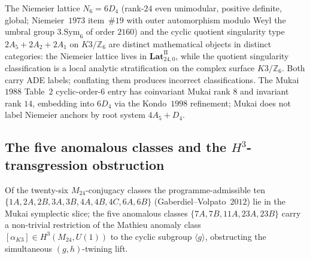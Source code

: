 \begin{remark}
\label{rem:k3e-niemeier-vs-fixed-locus}
The Niemeier lattice $N_6 = 6 D_4$ (rank-$24$ even unimodular, positive definite, global; Niemeier~$1973$ item~\#$19$ with outer automorphism modulo Weyl the umbral group $3.\mathrm{Sym}_6$ of order $2160$) and the cyclic quotient singularity type $2 A_5 + 2 A_2 + 2 A_1$ on $K3/\mathbb{Z}_6$ are distinct mathematical objects in distinct categories: the Niemeier lattice lives in $\mathbf{Lat}^{\mathrm{II}}_{24, 0}$, while the quotient singularity classification is a local analytic stratification on the complex surface $K3/\mathbb{Z}_6$. Both carry ADE labels; conflating them produces incorrect classifications. The Mukai~$1988$ Table~$2$ cyclic-order-$6$ entry has coinvariant Mukai rank $8$ and invariant rank $14$, embedding into $6 D_4$ via the Kondo~$1998$ refinement; Mukai does not label Niemeier anchors by root system $4 A_5 + D_4$.
\end{remark}

\subsection{The five anomalous classes and the \texorpdfstring{$H^3$}{H-3}-transgression obstruction}
\label{subsec:k3e-anomalous-H3-transgression}

Of the twenty-six $M_{24}$-conjugacy classes the programme-admissible ten $\{1A, 2A, 2B, 3A, 3B, 4A, 4B, 4C, 6A, 6B\}$ (Gaberdiel--Volpato~$2012$) lie in the Mukai symplectic slice; the five anomalous classes $\{7A, 7B, 11A, 23A, 23B\}$ carry a non-trivial restriction of the Mathieu anomaly class $[\alpha_{K3}] \in H^3(M_{24}, U(1))$ to the cyclic subgroup $\langle g \rangle$, obstructing the simultaneous $(g, h)$-twining lift.

